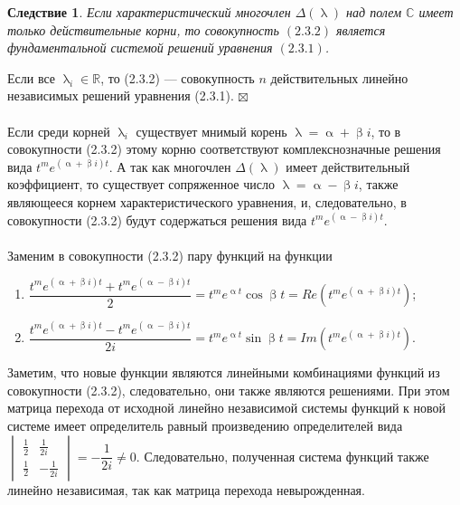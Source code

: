 \documentclass[a4paper, 12pt]{report}
\newenvironment{Proof} %
{\par\noindent{$\blacklozenge$}} %
{\hfill$\scriptstyle\boxtimes$}
\newcommand{\Rm}{\mathbb{R}}
\newcommand{\Cm}{\mathbb{C}}
\renewcommand{\alpha}{\upalpha}
\renewcommand{\beta}{\upbeta}
\renewcommand{\lambda}{\uplambda}
\begin{document}
	\newtheorem*{2_3_2}{Следствие}\begin{2_3_2}
		Если характеристический многочлен $\Delta(\lambda)$ над полем $\Cm$ имеет только действительные корни, то совокупность $(2.3.2)$ является фундаментальной системой решений уравнения $(2.3.1)$.
	\end{2_3_2}\begin{Proof}
		Если все $\lambda_i\in\Rm$, то (2.3.2) --- совокупность $n$ действительных линейно независимых решений уравнения (2.3.1).
	\end{Proof}\\\\
	Если среди корней $\lambda_i$ существует мнимый корень $\lambda = \alpha + \beta i$, то в совокупности (2.3.2) этому корню соответствуют комплекснозначные решения вида $t^me^{(\alpha + \beta i)t}$. А так как многочлен $\Delta(\lambda)$ имеет действительный коэффициент, то существует сопряженное число $\lambda = \alpha - \beta i$, также являющееся корнем характеристического уравнения, и, следовательно, в совокупности (2.3.2) будут содержаться решения вида $t^me^{(\alpha - \beta i)t}$.\\\\
	Заменим в совокупности (2.3.2) пару функций на функции\begin{enumerate}
		\item $\dfrac{t^me^{(\alpha + \beta i)t} + t^me^{(\alpha - \beta i)t}}{2} = t^me^{\alpha t}\cos\beta t = Re(t^me^{(\alpha + \beta i)t})$;
		\item $\dfrac{t^me^{(\alpha + \beta i)t} - t^me^{(\alpha - \beta i)t}}{2i} = t^me^{\alpha t}\sin\beta t = Im(t^me^{(\alpha + \beta i)t})$.
	\end{enumerate}
	Заметим, что новые функции являются линейными комбинациями функций из совокупности (2.3.2), следовательно, они также являются решениями. При этом матрица перехода от исходной линейно независимой системы функций к новой системе имеет определитель равный произведению определителей вида $\begin{vmatrix}
		\frac{1}{2} & \frac{1}{2i}\\
		\frac{1}{2} & -\frac{1}{2i}
	\end{vmatrix} = -\dfrac{1}{2i}\ne 0$. Следовательно, полученная система функций также линейно независимая, так как матрица перехода невырожденная.
\end{document}
